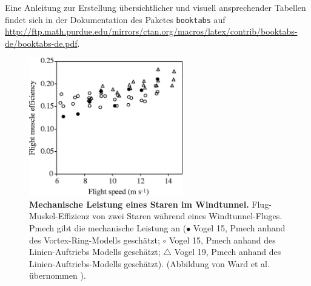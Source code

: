 \documentclass{scrreprt}
\begin{document}
Eine Anleitung zur Erstellung übersichtlicher und visuell ansprechender Tabellen findet sich in der Dokumentation des Paketes \verb|booktabs| auf \url{http://ftp.math.purdue.edu/mirrors/ctan.org/macros/latex/contrib/booktabs-de/booktabs-de.pdf}. 

\begin{figure}[htpb] %
	{\centering
		\includegraphics[height=6cm]{abbildungen/Starling_Mechpower.jpg} 
		\caption[Mechanische Leistung eines Staren im Windtunnel]{
			\textbf{Mechanische Leistung eines Staren im Windtunnel.} 
			Flug-Muskel-Effizienz von zwei Staren während eines Windtunnel-Fluges. Pmech gibt die mechanische Leistung an ($\bullet$ Vogel 15, Pmech anhand des Vortex-Ring-Modells geschätzt; $\circ$ Vogel 15, Pmech anhand des Linien-Auftriebs Modells geschätzt; $\triangle$ Vogel 19, Pmech anhand des Linien-Auftriebs-Modells geschätzt). (Abbildung von Ward et al. übernommen  \cite{Ward2001}).
			}
		\label{fig:beispielabbildung}
	}
\end{figure}
\end{document}
